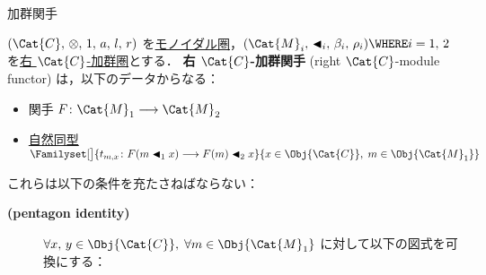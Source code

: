 \documentclass[TQFT_main]{subfiles}
\begin{document}
\begin{mydef}[label=def:module-functor,breakable]{加群関手}
    \tcblower

    $(\Cat{C},\, \otimes,\, 1,\, a,\, l,\, r)$ を\hyperref[redef:monoidal-category]{モノイダル圏}，$(\Cat{M}_i,\, \btl_i,\, \beta_i,\, \rho_i) \WHERE i =1,\, 2$ を\hyperref[def:modulecat]{右 $\Cat{C}$-加群圏}とする．
    \textbf{右 $\Cat{C}$-加群関手} (right $\Cat{C}$-module functor) は，以下のデータからなる：
    \begin{itemize}
        \item 関手 $F \colon \Cat{M}_1 \lto \Cat{M}_2$
        \item \hyperref[def:nat]{自然同型} $\Familyset[\big]{t_{m,x} \colon F(m \btl_1 x) \lto F(m) \btl_2 x}{x \in \Obj{\Cat{C}},\; m \in \Obj{\Cat{M}_1}}$
    \end{itemize}
    これらは以下の条件を充たさねばならない：
    \begin{description}
        \item[\textbf{(pentagon identity)}] $\forall x,\, y \in \Obj{\Cat{C}},\; \forall m \in \Obj{\Cat{M}_1}$ に対して以下の図式を可換にする：
        \begin{flushleft}
\end{flushleft}
\end{description}
\end{mydef}
\end{document}
